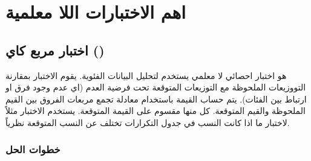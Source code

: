 \chapter{اهم الاختبارات اللا معلمية}

\section{اختبار مربع كاي ()}
هو اختبار احصائي لا معلمي يستخدم لتحليل البيانات الفئوية. يقوم الاختبار بمقارنة التووزيعات الملحوظة مع التوزيعات المتوقعة تحت فرضية العدم (اي عدم وجود فرق او ارتباط بين الفئات). يتم حساب القيمة باستخدام معادلة تجمع مربعات الفروق بين القيم الملحوظة والقيم المتوقعة. كل منها مقسوم على القيمة المتوقعة. يستخدم الاختبار مثلاً لاختبار ما اذا كانت النسب في جدول التكرارات تختلف عن النسب المتوقعة نظرياً.

\subsection*{خطوات الحل}
	
